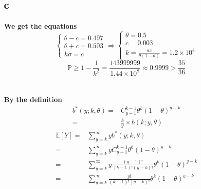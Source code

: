 \documentclass{article}
\begin{document}
        \subsection*{c}
        \paragraph{
            We get the equations
            \begin{equation*}
                \begin{cases}
                   \theta-c=0.497\\
                   \theta+c=0.503\\
                    k\sigma=c
                \end{cases}
                \Rightarrow
                \begin{cases}
                   \theta=0.5\\
                    c=0.003\\
                    k=\frac{nc}{\theta(1-\theta)}=1.2\times10^4
                \end{cases}
            \end{equation*}
            $$\mathbb{P}\geq 1-\frac{1}{k^2}=\frac{143999999}{1.44\times10^8}\approx 0.9999>\frac{35}{36}$$
        }

    \section{}
    \paragraph{
        By the definition
        \begin{equation*}
            \begin{split}
                b^*(y;k,\theta)=&C_{y-1}^{k-1}\theta^k(1-\theta)^{y-k}\\
                    =&\frac{k}{y}\times b(k;y,\theta)
            \end{split}
        \end{equation*}
        \begin{equation*}
            \begin{split}
                \mathbb{E}[Y]=&\sum_{y=k}^\infty yb^*(y;k,\theta)\\
                    =&\sum_{y=k}^\infty y C_{y-1}^{k-1}\theta^k(1-\theta)^{y-k}\\
                    =&\sum_{y=k}^\infty y \frac{(y-1)!}{(k-1)!(y-k)!}\theta^k(1-\theta)^{y-k}\\
                    =&\sum_{y=k}^\infty \frac{y!}{(k-1)!(y-k)!}\theta^k(1-\theta)^{y-k}\\
            \end{split}
        \end{equation*}
    }
\end{document}
